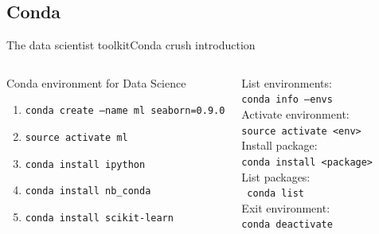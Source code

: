 \documentclass[10pt,compress]{beamer} %
\begin{document}
\subsection{Conda}
\begin{frame}{The data scientist toolkit}{Conda crush introduction}
    \begin{columns}
	   \begin{block}{Conda environment for Data Science}
	   	\begin{enumerate}
			\item \texttt{conda create --name ml seaborn=0.9.0}
			\item \texttt{source activate ml}
			\item \texttt{conda install ipython}
			\item \texttt{conda install nb\_conda}
			\item \texttt{conda install scikit-learn}
		\end{enumerate}
	   \end{block}

		List environments: \\ \quad \texttt{conda info --envs}\\
		Activate environment: \\ \quad \texttt{source activate <env>}\\
		Install package: \\ \quad \texttt{conda install <package>}\\
		List packages: \\ \quad \texttt{conda list}\\
		Exit environment: \\ \quad \indent \texttt{conda deactivate}
	\end{columns}
\end{frame}
\end{document}
